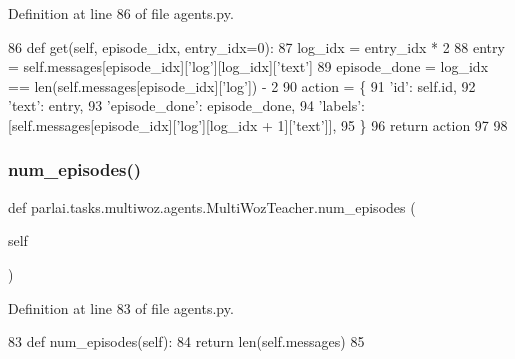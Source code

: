 Definition at line 86 of file agents.\+py.


\begin{DoxyCode}
86     \textcolor{keyword}{def }get(self, episode\_idx, entry\_idx=0):
87         log\_idx = entry\_idx * 2
88         entry = self.messages[episode\_idx][\textcolor{stringliteral}{'log'}][log\_idx][\textcolor{stringliteral}{'text'}]
89         episode\_done = log\_idx == len(self.messages[episode\_idx][\textcolor{stringliteral}{'log'}]) - 2
90         action = \{
91             \textcolor{stringliteral}{'id'}: self.id,
92             \textcolor{stringliteral}{'text'}: entry,
93             \textcolor{stringliteral}{'episode\_done'}: episode\_done,
94             \textcolor{stringliteral}{'labels'}: [self.messages[episode\_idx][\textcolor{stringliteral}{'log'}][log\_idx + 1][\textcolor{stringliteral}{'text'}]],
95         \}
96         \textcolor{keywordflow}{return} action
97 
98 
\end{DoxyCode}
\mbox{\label{classparlai_1_1tasks_1_1multiwoz_1_1agents_1_1MultiWozTeacher_a0b28fec07160f7a36bc820fb74baf5b2}} 
\subsubsection{\texorpdfstring{num\+\_\+episodes()}{num\_episodes()}}
{\footnotesize\ttfamily def parlai.\+tasks.\+multiwoz.\+agents.\+Multi\+Woz\+Teacher.\+num\+\_\+episodes (\begin{DoxyParamCaption}\item[{}]{self }\end{DoxyParamCaption})}



Definition at line 83 of file agents.\+py.


\begin{DoxyCode}
83     \textcolor{keyword}{def }num\_episodes(self):
84         \textcolor{keywordflow}{return} len(self.messages)
85 
\end{DoxyCode}
\mbox{\label{classparlai_1_1tasks_1_1multiwoz_1_1agents_1_1MultiWozTeacher_ae7ddc7d7ceb61b839b58280ddcf4b390}} 
